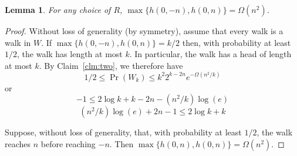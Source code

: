 \documentclass{article}
\newtheorem{clm}{Claim}
\newtheorem{lem}{Lemma}
\newcommand{\E}{\mathrm{E}\,}
\begin{document}
\begin{lem}
For any choice of $R$, $\max\{h(0,-n), h(0,n)\} = \Omega(n^2)$.
\end{lem}

\begin{proof}
Without loss of generality (by symmetry), assume that every walk is a
walk in $W$.  If $\max\{h(0,-n), h(0,n)\}=k/2$ then, with probability at
least $1/2$, the walk has length at most $k$.  In particular, the walk has
a head of length at most $k$. By Claim~\ref{clm:two}, we therefore have
\[
   1/2 \le \Pr(W_k) \le k^2 2^{k-2n}e^{-\Omega(n^2/k)}
\]
or
\[  -1 \le 2\log k + k - 2n - (n^2/k)\log(e) \]
\[ (n^2/k)\log(e) +  2n - 1 \le 2\log k + k  \]

Suppose, without loss of generality, that, with probability at least $1/2$, the
walk reaches $n$ before reaching $-n$.  Then $\max\{h(0,n), h(0,n)\} = \Omega(n^2)$.



\end{proof}






%
%
%
%
%
%
%
%
%
%
%
\end{document}
